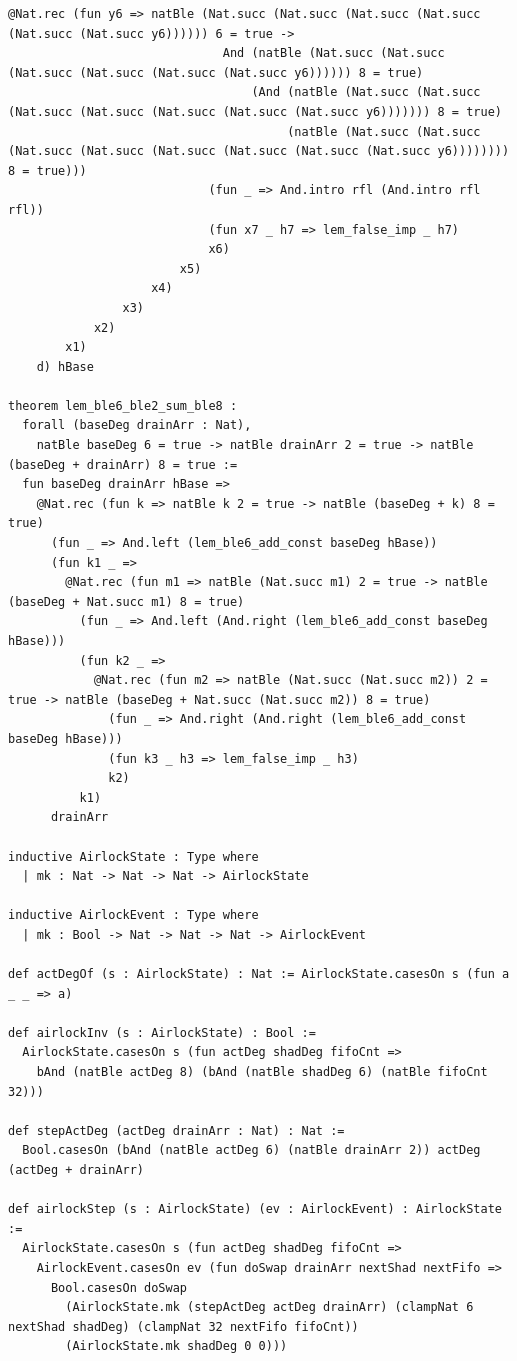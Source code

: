 \documentclass[10pt,twocolumn]{article}
\theoremstyle{spectralthm}
\begin{document}
\begin{lstlisting}[language=Lean4,caption={Standalone Pure Init.Prelude Term-Mode Lean 4 Expansion (thm30--thm37, v1.1.0, 0 sorry, 0 axioms).},label={lst:lean_v110}]
                          @Nat.rec (fun y6 => natBle (Nat.succ (Nat.succ (Nat.succ (Nat.succ (Nat.succ (Nat.succ y6)))))) 6 = true ->
                              And (natBle (Nat.succ (Nat.succ (Nat.succ (Nat.succ (Nat.succ (Nat.succ y6)))))) 8 = true)
                                  (And (natBle (Nat.succ (Nat.succ (Nat.succ (Nat.succ (Nat.succ (Nat.succ (Nat.succ y6))))))) 8 = true)
                                       (natBle (Nat.succ (Nat.succ (Nat.succ (Nat.succ (Nat.succ (Nat.succ (Nat.succ (Nat.succ y6)))))))) 8 = true)))
                            (fun _ => And.intro rfl (And.intro rfl rfl))
                            (fun x7 _ h7 => lem_false_imp _ h7)
                            x6)
                        x5)
                    x4)
                x3)
            x2)
        x1)
    d) hBase

theorem lem_ble6_ble2_sum_ble8 :
  forall (baseDeg drainArr : Nat),
    natBle baseDeg 6 = true -> natBle drainArr 2 = true -> natBle (baseDeg + drainArr) 8 = true :=
  fun baseDeg drainArr hBase =>
    @Nat.rec (fun k => natBle k 2 = true -> natBle (baseDeg + k) 8 = true)
      (fun _ => And.left (lem_ble6_add_const baseDeg hBase))
      (fun k1 _ =>
        @Nat.rec (fun m1 => natBle (Nat.succ m1) 2 = true -> natBle (baseDeg + Nat.succ m1) 8 = true)
          (fun _ => And.left (And.right (lem_ble6_add_const baseDeg hBase)))
          (fun k2 _ =>
            @Nat.rec (fun m2 => natBle (Nat.succ (Nat.succ m2)) 2 = true -> natBle (baseDeg + Nat.succ (Nat.succ m2)) 8 = true)
              (fun _ => And.right (And.right (lem_ble6_add_const baseDeg hBase)))
              (fun k3 _ h3 => lem_false_imp _ h3)
              k2)
          k1)
      drainArr

inductive AirlockState : Type where
  | mk : Nat -> Nat -> Nat -> AirlockState

inductive AirlockEvent : Type where
  | mk : Bool -> Nat -> Nat -> Nat -> AirlockEvent

def actDegOf (s : AirlockState) : Nat := AirlockState.casesOn s (fun a _ _ => a)

def airlockInv (s : AirlockState) : Bool :=
  AirlockState.casesOn s (fun actDeg shadDeg fifoCnt =>
    bAnd (natBle actDeg 8) (bAnd (natBle shadDeg 6) (natBle fifoCnt 32)))

def stepActDeg (actDeg drainArr : Nat) : Nat :=
  Bool.casesOn (bAnd (natBle actDeg 6) (natBle drainArr 2)) actDeg (actDeg + drainArr)

def airlockStep (s : AirlockState) (ev : AirlockEvent) : AirlockState :=
  AirlockState.casesOn s (fun actDeg shadDeg fifoCnt =>
    AirlockEvent.casesOn ev (fun doSwap drainArr nextShad nextFifo =>
      Bool.casesOn doSwap
        (AirlockState.mk (stepActDeg actDeg drainArr) (clampNat 6 nextShad shadDeg) (clampNat 32 nextFifo fifoCnt))
        (AirlockState.mk shadDeg 0 0)))


\end{lstlisting}
\end{document}
